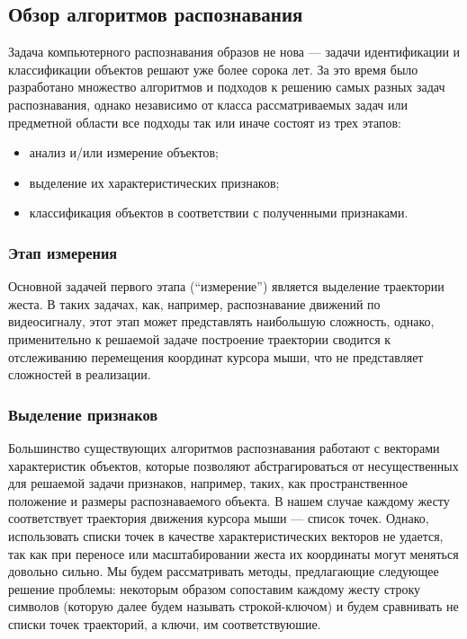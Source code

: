 \documentclass[a5paper]{article}
\begin{document}
\subsection{Обзор алгоритмов распознавания}
Задача компьютерного распознавания образов не нова --- задачи идентификации и классификации объектов решают уже более сорока лет. За это время было разработано множество алгоритмов и подходов к решению самых разных задач распознавания, однако независимо от класса рассматриваемых задач или предметной области все подходы так или иначе состоят из трех этапов: 
\begin{itemize}
  \item анализ и/или измерение объектов;
  \item выделение их характеристических признаков;
  \item классификация объектов в соответствии с полученными признаками.
\end{itemize}

\subsubsection{Этап измерения}
Основной задачей первого этапа (``измерение'') является выделение траектории жеста. В таких задачах, как, например, распознавание движений по видеосигналу, этот этап может представлять наибольшую сложность, однако, применительно к решаемой задаче построение траектории сводится к отслеживанию перемещения координат курсора мыши, что не представляет сложностей в реализации. 

\subsubsection{Выделение признаков}
Большинство существующих алгоритмов распознавания работают с векторами характеристик объектов, которые позволяют абстрагироваться от несущественных для решаемой задачи признаков, например, таких, как пространственное положение и размеры распознаваемого объекта. В нашем случае каждому жесту соответствует траектория движения курсора мыши --- список точек. Однако, использовать списки точек в качестве характеристических векторов не удается, так как при переносе или масштабировании жеста их координаты могут меняться довольно сильно. Мы будем рассматривать методы, предлагающие следующее решение проблемы: некоторым образом сопоставим каждому жесту строку символов (которую далее будем называть строкой-ключом) и будем сравнивать не списки точек траекторий, а ключи, им соответствуюшие.
\end{document}
